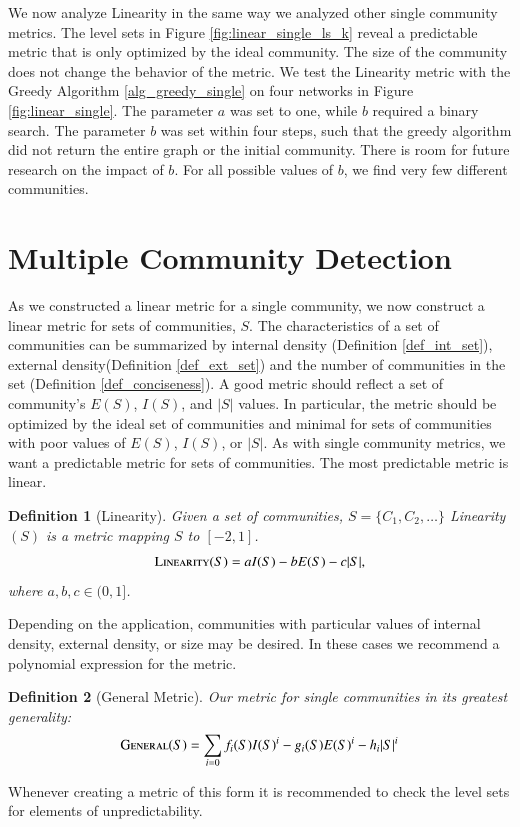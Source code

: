 \documentclass[phd,tocprelim]{cornell}
\newtheorem{definition}{Definition}
\begin{document}
We now analyze {\sc Linearity} in the same way we analyzed other single community metrics.  The level sets in Figure \ref{fig:linear_single_ls_k} reveal a predictable metric that is only optimized by the ideal community. The size of the community does not change the behavior of the metric.  We test the {\sc Linearity} metric  with the Greedy Algorithm \ref{alg_greedy_single} on four networks in Figure \ref{fig:linear_single}.  The parameter $a$ was set to one, while $b$ required a binary search.  The parameter $b$ was set within four steps, such that the greedy algorithm did not return the entire graph or the initial community. There is room for future research on the impact of $b$.  For all possible values of $b$, we find very few different communities.





\section{Multiple Community Detection}

As we constructed a linear metric for a single community, we now construct a linear metric for sets of communities, $S$.  The characteristics of a set of communities can be summarized by internal density (Definition \ref{def_int_set}), external density(Definition \ref{def_ext_set}) and the number of communities in the set (Definition \ref{def_conciseness}).  A good metric should reflect a set of community's $E(S)$, $I(S)$, and $|S|$ values.  In particular, the metric should be optimized by the ideal set of communities and minimal for sets of communities with poor values of $E(S)$, $I(S)$, or $|S|$.  As with single community metrics, we want a predictable metric for sets of communities.  The most predictable metric is linear.
\begin{definition}[Linearity] Given a set of communities, $S = \{C_1, C_2, \dots \}$ {\sc Linearity}$(S)$ is a metric mapping $S$ to $[-2, 1]$.
  \begin{equation}
   \mbox{\sc Linearity}(S) = a I(S) - b E(S) - c |S|,
  \end{equation}
where $a,b,c \in (0, 1]$.
\end{definition}
Depending on the application, communities with particular values of internal density, external density, or size may be desired.  In these cases we recommend a polynomial expression for the metric.
\begin{definition}[General Metric]
 Our metric for single communities in its greatest generality:
  \begin{equation}
   \mbox{\sc General} (S) = \sum\limits_{i = 0} f_i(S) I(S)^i - g_i(S) E(S)^i - h_i |S|^i
  \end{equation}
\end{definition}
Whenever creating a metric of this form it is recommended to check the level sets for elements of unpredictability.
\end{document}

